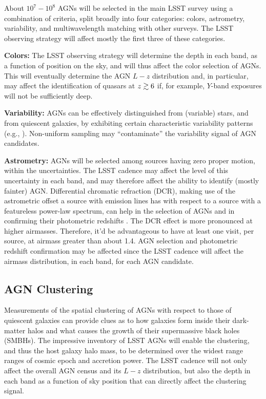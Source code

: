\noindent About $10^7 - 10^8$ AGNs will be selected in the main LSST
survey using a combination of criteria, split broadly into four
categories: colors, astrometry, variability, and multiwavelength
matching with other surveys. The LSST observing strategy will affect
mostly the first three of these categories.

{\bf Colors:} The LSST observing strategy will determine the depth in
each band, as a function of position on the sky, and will thus affect
the color selection of AGNs. This will eventually determine the AGN
$L-z$ distribution and, in particular, may affect the identification
of quasars at $z\gtrsim 6$ if, for example, $Y$-band exposures will
not be sufficiently deep.

{\bf Variability:} AGNs can be effectively distinguished from (variable)
stars, and from quiescent galaxies, by exhibiting certain characteristic
variability patterns (e.g., \citet{ButlerandBloom2011}). Non-uniform
sampling may ``contaminate'' the variability signal of AGN candidates.

{\bf Astrometry:} AGNs will be selected among sources having zero
proper motion, within the uncertainties. The LSST cadence may affect
the level of this uncertainty in each band, and may therefore affect
the ability to identify (mostly fainter) AGN.
%
Differential chromatic refraction (DCR), making use of the astrometric
offset a source with emission lines has with respect to a source with
a featureless power-law spectrum, can help in the selection of AGNs
and in confirming their photometric redshifts
\citep{KaczmarczikEtal2009}. The DCR effect is more pronounced at
higher airmasses. Therefore, it'd be advantageous to have at least one
visit, per source, at airmass greater than about 1.4. AGN selection
and photometric redshift confirmation may be affected since the LSST
cadence will affect the airmass distribution, in each band, for each
AGN candidate.






\subsection{AGN Clustering}
\label{sec:\secname:clustering}

\noindent Measurements of the spatial clustering of AGNs with respect
to those of quiescent galaxies can provide clues as to how galaxies
form inside their dark-matter halos and what causes the growth of
their supermassive black holes (SMBHs). The impressive inventory of
LSST AGNs will enable the clustering, and thus the host galaxy halo
mass, to be determined over the widest range ranges of cosmic epoch
and accretion power.
%
The LSST cadence will not only affect the overall AGN census and its
$L-z$ distribution, but also the depth in each band as a function of
sky position that can directly affect the clustering signal.

